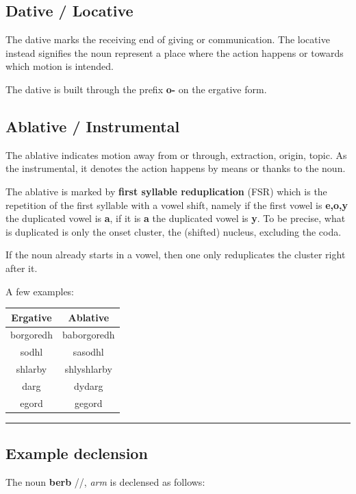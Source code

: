 \documentclass[10pt,oneside]{memoir}
\newcommand{\ipa}[1]{/\textipa{#1}/}
\begin{document}
\begin{multicols}{2}
\subsection{Dative / Locative}

The dative marks the receiving end of giving or communication. The locative instead signifies the noun represent a place where the action happens or towards which motion is intended.

The dative is built through the prefix \textbf{o-} on the ergative form.

\subsection{Ablative / Instrumental}

The ablative indicates motion away from or through, extraction, origin, topic. As the instrumental, it denotes the action happens by means or thanks to the noun.

The ablative is marked by \textbf{first syllable reduplication} (FSR) which is the repetition of the first syllable with a vowel shift, namely if the first vowel is \textbf{e,o,y} the duplicated vowel is \textbf{a}, if it is \textbf{a} the duplicated vowel is \textbf{y}. To be precise, what is duplicated is only the onset cluster, the (shifted) nucleus, excluding the coda. 

If the noun already starts in a vowel, then one only reduplicates the cluster right after it.

A few examples:

\begin{center}
    \begin{tabular}[]{c | c}
        Ergative & Ablative\\
        \hline
        borgoredh & baborgoredh\\
        sodhl & sasodhl\\
        shlarby & shlyshlarby\\
        darg & dydarg \\
        egord & gegord
    \end{tabular}
\end{center}


\end{multicols}
\hrule
\subsection{Example declension}

The noun \textbf{berb} \ipa{bErb}, \emph{arm} is declensed as follows:
\end{document}
